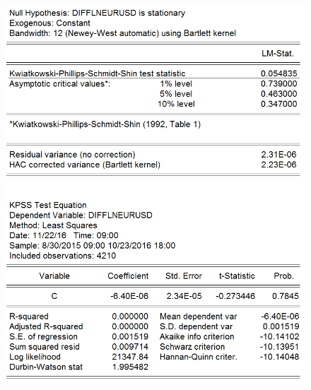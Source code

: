 \documentclass[11pt]{report}
\begin{document}
\begin{figure}[!h]
\begin{minipage}[c]{.46\linewidth}
\includegraphics[scale=0.5]{Appendix/chap2/10}
\end{minipage} \hfill
\begin{minipage}[c]{.46\linewidth}

\end{minipage}
\end{figure}
\end{document}
